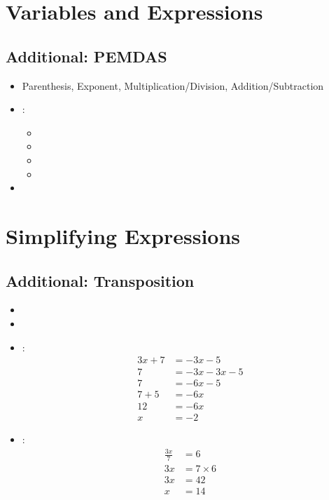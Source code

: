 

\section{Variables and Expressions}

\subsection*{Additional: PEMDAS}
\begin{itemize}
    \item Parenthesis, Exponent, Multiplication/Division, Addition/Subtraction
    \item {}:
    \begin{itemize}
        \item {}
        \item {}
        \item {}
        \item {}
    \end{itemize}
    \item {}
\end{itemize}

\section{Simplifying Expressions}

\subsection*{Additional: Transposition}
\begin{itemize}
    \item {}
    \item {}
    \item {}:
    \begin{align*}
        3x + 7 &= -3x - 5 \\
        7 &= -3x - 3x - 5 \\
        7 &= -6x - 5 \\
        7 + 5 &= -6x \\
        12 &= -6x \\
        x &= -2
    \end{align*}
    \item {}:
    \begin{align*}
        \frac{3x}{7} &= 6 \\
        3x &= 7 \times 6 \\
        3x &= 42 \\
        x &= 14
    \end{align*}
\end{itemize}

